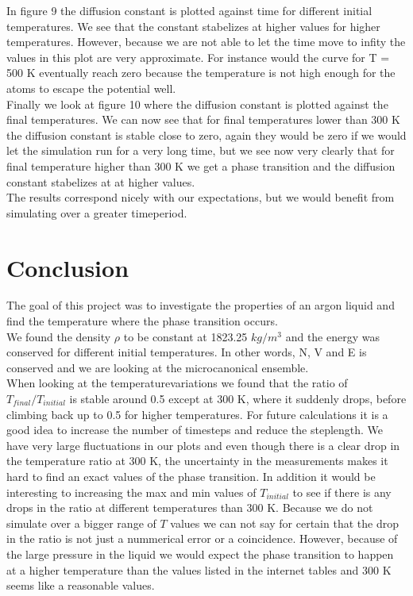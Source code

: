 \documentclass[a4paper, 12pt]{article}
\begin{document}
In figure 9 the diffusion constant is plotted against time for different initial temperatures. We see that the constant stabelizes at higher values for higher temperatures. However, because we are not able to let the time move to infity the values in this plot are very approximate. For instance would the curve for T = 500 K eventually reach zero because the temperature is not high enough for the atoms to escape the potential well.\\

Finally we look at figure 10 where the diffusion constant is plotted against the final temperatures. We can now see that for final temperatures lower than 300 K the diffusion constant is stable close to zero, again they would be zero if we would let the simulation run for a very long time, but we see now very clearly that for final temperature higher than 300 K we get a phase transition and the diffusion constant stabelizes at at higher values.\\

The results correspond nicely with our expectations, but we would benefit from simulating over a greater timeperiod.
\newpage
\section{Conclusion}
The goal of this project was to investigate the properties of an argon liquid and find the temperature where the phase transition occurs.\\
We found the density $\rho$ to be constant at 1823.25 $kg/m^{3}$ and the energy was conserved for different initial temperatures. In other words, N, V and E is conserved and we are looking at the microcanonical ensemble.\\

When looking at the temperaturevariations we found that the ratio of $T_{final}/T_{initial}$ is stable around 0.5 except at 300 K, where it suddenly drops, before climbing back up to 0.5 for higher temperatures. For future calculations it is a good idea to increase the number of timesteps and reduce the steplength. We have very large fluctuations in our plots and even though there is a clear drop in the temperature ratio at 300 K, the uncertainty in the measurements makes it hard to find an exact values of the phase transition. In addition it would be interesting to increasing the  max and min values of $T_{initial}$ to see if there is any drops in the ratio at different temperatures than 300 K. Because we do not simulate over a bigger range of $T$ values we can not say for certain that the drop in the ratio is not just a nummerical error or a coincidence. However, because of the large pressure in the liquid we would expect the phase transition to happen at a higher temperature than the values listed in the internet tables\cite{Argon} and 300 K seems like a reasonable values.\\
\end{document}

